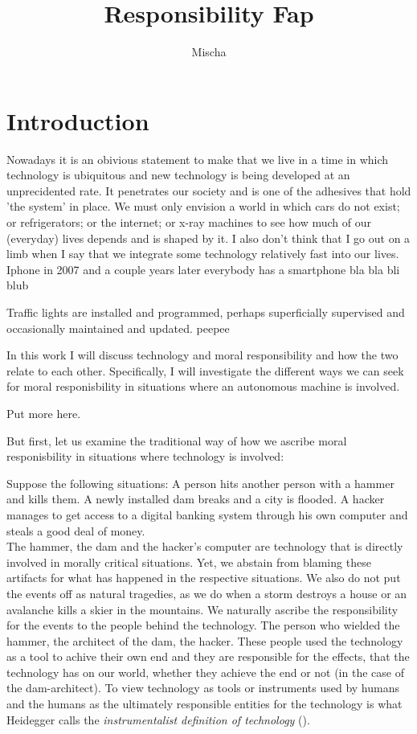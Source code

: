 \documentclass{article}
\title{Responsibility Fap}
\author{Mischa}
\begin{document}
\begin{titlepage}
	\maketitle
\end{titlepage}
\tableofcontents
\newpage
\section{Introduction}

Nowadays it is an obivious statement to make that we live in a time in which
technology is ubiquitous and new technology is being developed at an
unprecidented rate. It penetrates our society and is one of the adhesives that
hold 'the system' in place. We must only envision a world in which cars do not
exist; or refrigerators; or the internet; or x-ray machines to see how much of
our (everyday) lives depends and is shaped by it. I also don't think that I go
out on a limb when I say that we integrate some technology relatively fast into
our lives. Iphone in 2007 and a couple years later everybody has a smartphone
bla bla bli blub


Traffic lights are installed and programmed, perhaps superficially supervised
and occasionally maintained and updated. peepee

In this work I will discuss technology and moral responsibility and how the two
relate to each other. Specifically, I will investigate the different ways we can seek
for moral responisbility in situations where an autonomous machine is involved.

Put more here.

But first, let us examine the traditional way of how we ascribe moral
responisbility in situations where technology is involved:

Suppose the following situations: A person hits another person with a hammer and
kills them. A newly installed dam breaks and a city is flooded. A hacker manages
to get access to a digital banking system through his own computer and steals a
good deal of money.\\

The hammer, the dam and the hacker's computer are technology that is directly
involved in morally critical situations. Yet, we abstain from blaming these
artifacts for what has happened in the respective situations. We also do not put
the events off as natural tragedies, as we do when a storm destroys a house or
an avalanche kills a skier in the mountains. We naturally ascribe the
responsibility for the events to the people behind the technology.
The person who wielded the hammer, the architect of the dam, the hacker.
These people used the technology as a tool to achive their own end and they are
responsible for the effects, that the technology has on our world, whether they
achieve the end or not (in the case of the dam-architect).
To view technology as tools or instruments used by humans and the humans as the ultimately
responsible entities for the technology is what Heidegger calls the \textit{instrumentalist
definition of technology} (\cite{heidegger1977technology}). 
\end{document}
